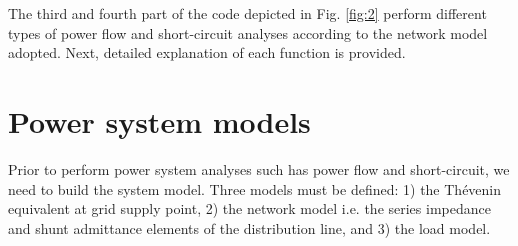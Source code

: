 \documentclass[12pt]{article}
\begin{document}
The third and fourth part of the code depicted in Fig. \ref{fig:2} perform different types of power flow and short-circuit analyses according to the network model adopted. Next, detailed explanation of each function is provided.

\begin{figure}[hbt]
\end{figure}
\begin{figure}[hbt]
\end{figure}
\newpage



\section{Power system models}

Prior to perform power system analyses such has power flow and  short-circuit, we need to build the system
model. Three models must be defined: 1) the Th\'evenin equivalent at grid supply point, 2) the network model i.e. the series impedance and shunt admittance elements of the distribution line, and  3) the load model.

\end{document}
